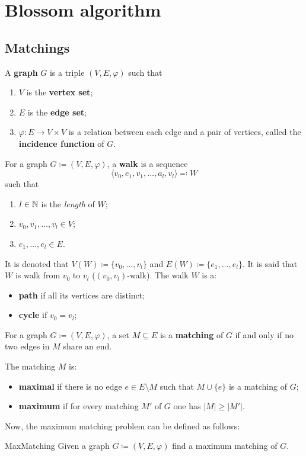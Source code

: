 \chapter{Blossom algorithm}

\enlargethispage{.5\baselineskip}

\section{Matchings}
\label{cap:grafos}

\begin{definition}[Graph]
	A \textbf{graph} \(G\) is a triple \((V, E, \varphi)\) such that
	\begin{enumerate}[label=(\roman*)]
		\item \(V\) is the \textbf{vertex set};
		\item \(E\) is the \textbf{edge set};
		\item \(\varphi: E \to V \times V\) is a relation between each edge and a pair of vertices, called the \textbf{incidence function} of \(G\).
	\end{enumerate}
\end{definition}

\begin{definition}[Walk]
	For a graph \(G \coloneqq (V, E, \varphi)\), a \textbf{walk} is a sequence
	\[
		\langle v_0, e_1, v_1, \dots, a_l, v_l \rangle \eqqcolon W
	\]
	such that
	\begin{enumerate}[label=(\roman*)]
		\item \(l \in \mathbb{N}\) is the \textit{length} of \(W\);
		\item \(v_0, v_1, \dots, v_l \in V\);
		\item \(e_1, \dots, e_l \in E\).
	\end{enumerate}
	It is denoted that \(V(W) 
	\coloneqq \{v_0, \dots, v_l\}\) 
	and 
	\(E(W) \coloneqq \{e_1, \dots, e_l\}\). 
	It is said that \(W\) is walk from \(v_0\) to \(v_l\) (\((v_0, v_l)\)-walk).
	The walk \(W\) is a:
	\begin{itemize}
		\item 
			\textbf{path} if all its vertices are distinct;
		\item 
			\textbf{cycle} if \(v_0 = v_l\);
	\end{itemize}
\end{definition}

\begin{definition}[Matching]
	For a graph \(G \coloneqq (V, E, \varphi)\), a set \(M \subseteq E\) is a \textbf{matching} of \(G\) if and only if no two edges in \(M\) share an end.

	The matching \(M\) is:
	\begin{itemize}
		\item 
			\textbf{maximal} if there is no edge \(e \in E \setminus M\) such that \(M \cup \{e\}\) is a matching of \(G\);
		\item
			\textbf{maximum} if for every matching \(M'\) of \(G\) one has \(|M| \geq |M'|\).
	\end{itemize}
\end{definition}

Now, the maximum matching problem can be defined as follows:
\\
\begin{problem}{MaxMatching}
	Given a graph \(G \coloneqq (V, E, \varphi)\) find a maximum matching of \(G\).
\end{problem}


